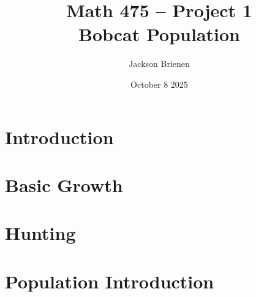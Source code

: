 \documentclass{article}
\title{Math 475 -- Project 1 \\ Bobcat Population}
\author{Jackson Brienen}
\date{October 8 2025}
\begin{document}
\maketitle

\section{Introduction}


\section{Basic Growth}

\section{Hunting}

\section{Population Introduction}
\end{document}

